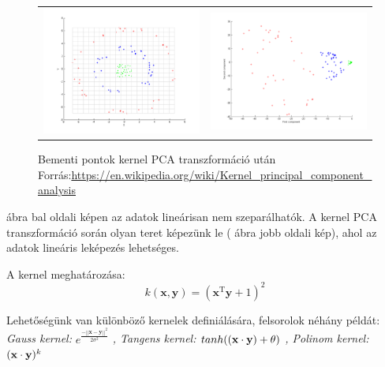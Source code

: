 \begin{itemize}
\begin{figure}[h]
\centering
\captionsetup{justification=centering}
\begin{tabular}{ c c }
\includegraphics[scale=0.8]{images/kernel_pca_input} & \includegraphics[scale=0.8]{images/kernel_pca_output}
\end{tabular}
\caption[caption]{Bementi pontok kernel PCA transzformáció után
\hspace{\textwidth}Forrás:\url{https://en.wikipedia.org/wiki/Kernel_principal_component_analysis}}
\label{fig:kernel_pca_input}
\end{figure}

 ábra bal oldali képen az adatok lineárisan nem szeparálhatók. A kernel PCA transzformáció során olyan teret képezünk le ( ábra jobb oldali kép), ahol az adatok lineáris leképezés lehetséges.

A kernel meghatározása:
$$
k({\boldsymbol  {x}},{\boldsymbol  {y}})=({\boldsymbol  {x}}^{{\mathrm  {T}}}{\boldsymbol  {y}}+1)^{2}
$$

Lehetőségünk van különböző kernelek definiálására, felsorolok néhány példát: \textit{Gauss kernel:} $e^{{\frac  {-||{\boldsymbol  {x}}-{\boldsymbol  {y}}||^{2}}{2\sigma ^{2}}}}$ \textit{, Tangens kernel:} $tanh(({\bf x}\cdot {\bf y})+\theta)$ \textit{, Polinom kernel:} $({\bf x}\cdot {\bf y})^k$


\end{itemize}
